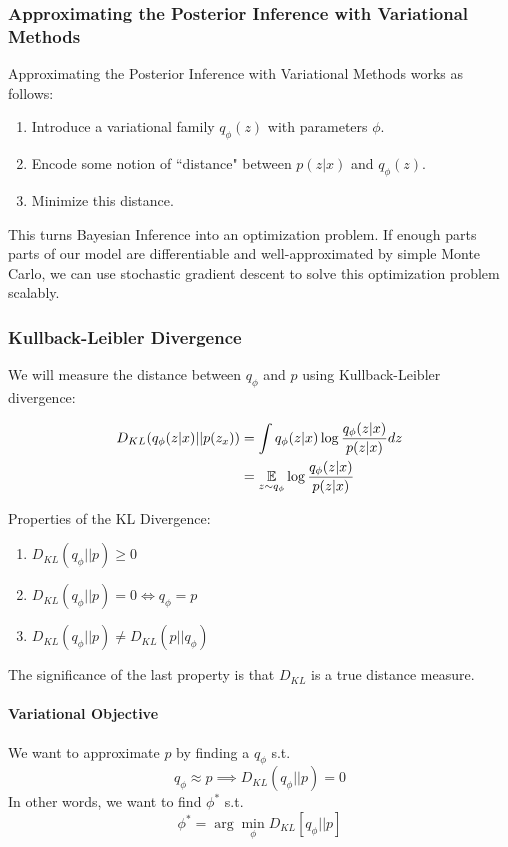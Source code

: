 \documentclass[11pt]{article}
\begin{document}
\subsubsection{Approximating the Posterior Inference with Variational Methods}
Approximating the Posterior Inference with Variational Methods works as follows:
\begin{enumerate}
	\item Introduce a variational family $q_\phi(z)$ with parameters $\phi$.
	\item Encode some notion of 	``distance" between $p(z|x)$ and $q_\phi(z)$.
	\item Minimize this distance.
\end{enumerate}

\remark
This turns Bayesian Inference into an optimization problem. If enough parts parts of our model are differentiable and well-approximated by simple Monte Carlo, we can use stochastic gradient descent to solve this optimization problem scalably.

\subsubsection{Kullback-Leibler Divergence}
We will measure the distance between $q_\phi$ and $p$ using Kullback-Leibler divergence:

\begin{align*}
	D_{KL}(q_\phi(z|x)||p(z_x)) &= \int q_\phi(z|x) \log \frac{q_\phi(z|x)}{p(z|x)} dz\\
	&= \underset{z \sim q_\phi}{\mathbb{E}} \log \frac{q_\phi(z|x)}{p(z|x)}
\end{align*}

\property
Properties of the KL Divergence:
\begin{enumerate}
	\item $D_{KL}(q_\phi ||p) \geq 0$
	\item $D_{KL}(q_\phi ||p) = 0 \iff q_\phi = p$
	\item $D_{KL}(q_\phi ||p) \neq D_{KL}(p||q_\phi)$
\end{enumerate}

\remark
The significance of the last property is that $D_{KL}$ is  a true distance measure.

\paragraph{Variational Objective}
We want to approximate $p$ by finding a $q_\phi$ s.t.
$$q_\phi \approx p \implies D_{KL}(q_\phi || p) = 0$$
In other words, we want to find $\phi^*$ s.t. 
$$\phi^* = \arg \min_\phi D_{KL}[q_\phi || p]$$
\remark
{}
\end{document}

